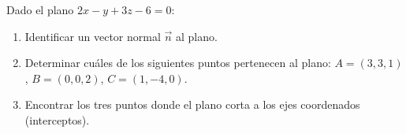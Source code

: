 Dado el plano $2x - y + 3z - 6 = 0$:
\begin{enumerate}
    \item Identificar un vector normal $\vec{n}$ al plano.
    \item Determinar cuáles de los siguientes puntos pertenecen al plano: $A = (3, 3, 1)$, $B = (0, 0, 2)$, $C = (1, -4, 0)$.
    \item Encontrar los tres puntos donde el plano corta a los ejes coordenados (interceptos).
\end{enumerate}